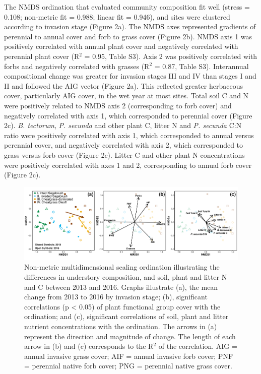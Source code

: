 \documentclass[
  11pt,
  a4paper,
]{article}
\begin{document}
The NMDS ordination that evaluated community composition fit well (stress = 0.108; non-metric fit = 0.988; linear fit = 0.946), and sites were clustered according to invasion stage (Figure 2a). The NMDS axes represented gradients of perennial to annual cover and forb to grass cover (Figure 2b). NMDS axis 1 was positively correlated with annual plant cover and negatively correlated with perennial plant cover (R\(^2\) = 0.95, Table S3). Axis 2 was positively correlated with forbs and negatively correlated with grasses (R\(^2\) = 0.87, Table S3). Interannual compositional change was greater for invasion stages III and IV than stages I and II and followed the AIG vector (Figure 2a). This reflected greater herbaceous cover, particularly AIG cover, in the wet year at most sites. Total soil C and N were positively related to NMDS axis 2 (corresponding to forb cover) and negatively correlated with axis 1, which corresponded to perennial cover (Figure 2c). \emph{B. tectorum}, \emph{P. secunda} and other plant C, litter N and \emph{P. secunda} C:N ratio were positively correlated with axis 1, which corresponded to annual versus perennial cover, and negatively correlated with axis 2, which corresponded to grass versus forb cover (Figure 2c). Litter C and other plant N concentrations were positively correlated with axes 1 and 2, corresponding to annual forb cover (Figure 2c).

\begin{figure}
\centering
\includegraphics{figures/fig_2_nmds_3panel.png}
\caption{Non-metric multidimensional scaling ordination illustrating the differences in understory composition, and soil, plant and litter N and C between 2013 and 2016. Graphs illustrate (a), the mean change from 2013 to 2016 by invasion stage; (b), significant correlations (p \textless{} 0.05) of plant functional group cover with the ordination; and (c), significant correlations of soil, plant and litter nutrient concentrations with the ordination. The arrows in (a) represent the direction and magnitude of change. The length of each arrow in (b) and (c) corresponds to the R\(^2\) of the correlation. AIG = annual invasive grass cover; AIF = annual invasive forb cover; PNF = perennial native forb cover; PNG = perennial native grass cover.}
\end{figure}
\end{document}
